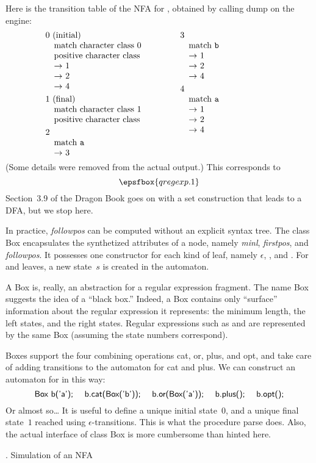 Here is the transition table of the NFA for , obtained by calling {\sf dump} on the engine:  $$\vtop{\hsize=0.4\hsize\obeylines
  $0$ (initial)
  \quad match character class $0$
  \quad positive character class
  \quad $\rightarrow$ $1$
  \quad $\rightarrow$ $2$
  \quad $\rightarrow$ $4$
\smallskip
  $1$ (final)
  \quad match character class $1$
  \quad positive character class
\smallskip
  $2$
  \quad match {\tt a}
  \quad $\rightarrow$ $3$
}\qquad\vtop{\hsize=0.4\hsize\obeylines
  $3$
  \quad match {\tt b}
  \quad $\rightarrow$ $1$
  \quad $\rightarrow$ $2$
  \quad $\rightarrow$ $4$
\smallskip
  $4$
  \quad match {\tt a}
  \quad $\rightarrow$ $1$
  \quad $\rightarrow$ $2$
  \quad $\rightarrow$ $4$
}$$  (Some details were removed from the actual output.)  This corresponds to $$\epsfbox{qregexp.1}$$  Section~3.9 of the Dragon Book goes on with a set construction that leads to a DFA, but we stop here.

In practice, {\it followpos\/} can be computed without an explicit syntax tree.  The class {\sf Box} encapsulates the synthetized attributes of a node, namely {\it minl}, {\it firstpos}, and {\it followpos}.  It possesses one constructor for each kind of leaf, namely $\epsilon$, , and .  For  and  leaves, a new state~$s$ is created in the automaton.

A {\sf Box} is, really, an abstraction for a regular expression fragment.  The name {\sf Box} suggests the idea of a ``black box.''  Indeed, a {\sf Box} contains only ``surface'' information about the regular expression it represents:  the minimum length, the left states, and the right states.  Regular expressions such as  and  are represented by the same {\sf Box} (assuming the state numbers correspond).

Boxes support the four combining operations {\sf cat}, {\sf or}, {\sf plus}, and {\sf opt}, and take care of adding transitions to the automaton for {\sf cat} and {\sf plus}.  We can construct an automaton for  in this way:  $$\hbox{\sf Box b('a'); \quad b.cat(Box('b')); \quad b.or(Box('a')); \quad b.plus(); \quad b.opt();}$$  Or almost so\dots{} It is useful to define a unique initial state~$0$, and a unique final state~$1$ reached using $\epsilon$-transitions.  This is what the procedure {\sf parse} does.  Also, the actual interface of class {\sf Box} is more cumbersome than hinted here.

. Simulation of an NFA

